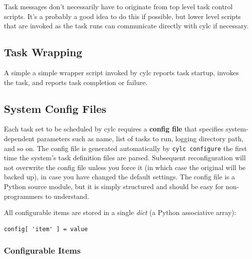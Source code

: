 \documentclass[11pt,a4paper]{article}
\begin{document}
Task messages don't necessarily have to originate from top level task
control scripts. It's a probably a good idea to do this if possible, but
lower level scripts that are invoked as the task runs can communicate
directly with cylc if necessary.

\subsection{Task Wrapping}

A simple a simple wrapper script invoked by cylc reports task
startup, invokes the task, and reports task completion or failure. 

\pagebreak
\subsection{System Config Files}

Each task set to be scheduled by cylc requires a {\bf config file} that
specifies system-dependent parameters such as name, list of tasks to
run, logging directory path, and so on. The config file is generated
automatically by \lstinline=cylc configure= the first time the system's
task definition files are parsed. Subsequent reconfiguration will not
overwrite the config file unless you force it (in which case the
original will be backed up), in case you have changed the default
settings. The config file is a Python source module, but it is simply
structured and should be easy for non-programmers to understand. 

All configurable items are stored in a single {\em dict} (a Python
associative array):

\lstset{language=Python}
\begin{lstlisting}
config[ 'item' ] = value
\end{lstlisting}

\subsubsection{Configurable Items}
\end{document}

